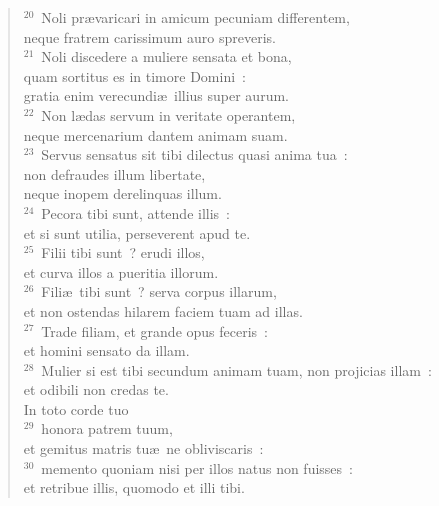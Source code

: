 \begin{flushleft}\begin{verse}${}^{20}$~Noli pr\ae varicari in amicum pecuniam differentem,\\ neque fratrem carissimum auro spreveris.\\
${}^{21}$~Noli discedere a muliere sensata et bona,\\ quam sortitus es in timore Domini~:\\ gratia enim verecundi\ae\ illius super aurum.\\
${}^{22}$~Non l\ae das servum in veritate operantem,\\ neque mercenarium dantem animam suam.\\
${}^{23}$~Servus sensatus sit tibi dilectus quasi anima tua~:\\ non defraudes illum libertate,\\ neque inopem derelinquas illum.\\
${}^{24}$~Pecora tibi sunt, attende illis~:\\ et si sunt utilia, perseverent apud te.\\
${}^{25}$~Filii tibi sunt~? erudi illos,\\ et curva illos a pueritia illorum.\\
${}^{26}$~Fili\ae\ tibi sunt~? serva corpus illarum,\\ et non ostendas hilarem faciem tuam ad illas.\\
${}^{27}$~Trade filiam, et grande opus feceris~:\\ et homini sensato da illam.\\
${}^{28}$~Mulier si est tibi secundum animam tuam, non projicias illam~:\\ et odibili non credas te.\\ In toto corde tuo\\
${}^{29}$~honora patrem tuum,\\ et gemitus matris tu\ae\ ne obliviscaris~:\\
${}^{30}$~memento quoniam nisi per illos natus non fuisses~:\\ et retribue illis, quomodo et illi tibi.\end{verse}\end{flushleft}


